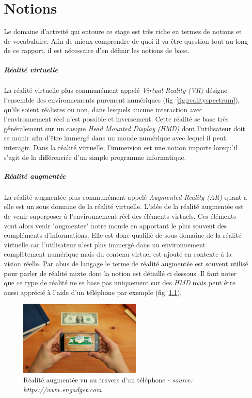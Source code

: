 \newpage
\chapter{Notions}
\label{chap:notions}

Le domaine d'activité qui entoure ce stage est très riche en termes de notions et de vocabulaire. Afin de mieux comprendre de quoi il va être question tout au long de ce rapport, il est nécessaire d'en définir les notions de base.

\paragraph{Réalité virtuelle}
La réalité virtuelle plus communément appelé \emph{Virtual Reality (VR)} désigne l'ensemble des environnements purement numériques (fig~\ref{fig;realityspectrum}), qu'ils soient réalistes ou non, dans lesquels aucune interaction avec l'environnement réel n'est possible et inversement. Cette réalité se base très généralement sur un casque \emph{Head Mounted Display (HMD)} dont l'utilisateur doit se munir afin d'être immergé dans un monde numérique avec lequel il peut interagir. Dans la réalité virtuelle, l'immersion est une notion importe lorsqu'il s'agit de la différenciée d'un simple programme informatique.

\paragraph{Réalité augmentée}
La réalité augmentée plus communément appelé \emph{Augmented Reality (AR)} quant a elle est un sous domaine de la réalité virtuelle. L'idée de la réalité augmentée est de venir superposer à l'environnement réel des éléments virtuels. Ces éléments vont alors venir "augmenter" notre monde en apportant le plus souvent des compléments d'informations. Elle est donc qualifié de sous domaine de la réalité virtuelle car l'utilisateur n'est plus immergé dans un environnement complètement numérique mais du contenu virtuel est ajouté en contexte à la vision réelle. Par abus de langage le terme de réalité augmentée est souvent utilisé pour parler de réalité mixte dont la notion est détaillé ci dessous.
Il faut noter que ce type de réalité ne se base pas uniquement sur des \emph{HMD} mais peut être aussi apprécié à l'aide d'un téléphone par exemple (fig~\ref{fig:AR}).

\begin{figure}
\centering
\includegraphics[width=0.55\textwidth]{images/AR}
\caption{Réalité augmentée vu au travers d'un téléphone - \textit{source: https://www.engadget.com}}
\label{fig:AR}
\end{figure}

